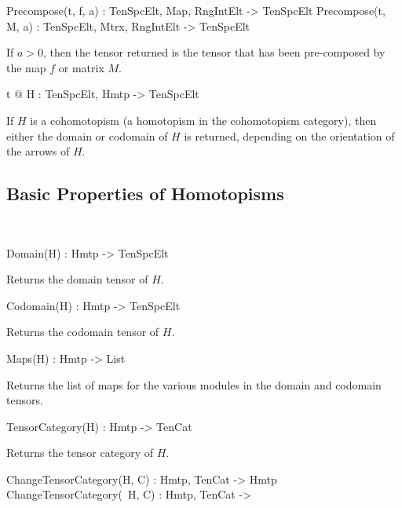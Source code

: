 \begin{intrinsics}
Precompose(t, f, a) : TenSpcElt, Map, RngIntElt -> TenSpcElt
Precompose(t, M, a) : TenSpcElt, Mtrx, RngIntElt -> TenSpcElt
\end{intrinsics}

If $a>0$, then the tensor returned is the tensor that has been pre-composed by the map $f$ or matrix $M$. 


\begin{intrinsics}
t @ H : TenSpcElt, Hmtp -> TenSpcElt
\end{intrinsics}

If $H$ is a cohomotopism (a homotopism in the cohomotopism category), then
either the domain or codomain of $H$ is returned, depending on the orientation
of the arrows of $H$.


\subsection{Basic Properties of Homotopisms}~

\begin{intrinsics}
Domain(H) : Hmtp -> TenSpcElt
\end{intrinsics}

Returns the domain tensor of $H$.

\begin{intrinsics}
Codomain(H) : Hmtp -> TenSpcElt
\end{intrinsics}

Returns the codomain tensor of $H$.

\begin{intrinsics}
Maps(H) : Hmtp -> List
\end{intrinsics}

Returns the list of maps for the various modules in the domain and codomain 
tensors.

\begin{intrinsics}
TensorCategory(H) : Hmtp -> TenCat
\end{intrinsics}

Returns the tensor category of $H$.

\begin{intrinsics}
ChangeTensorCategory(H, C) : Hmtp, TenCat -> Hmtp
ChangeTensorCategory(~H, C) : Hmtp, TenCat -> 
\end{intrinsics}

